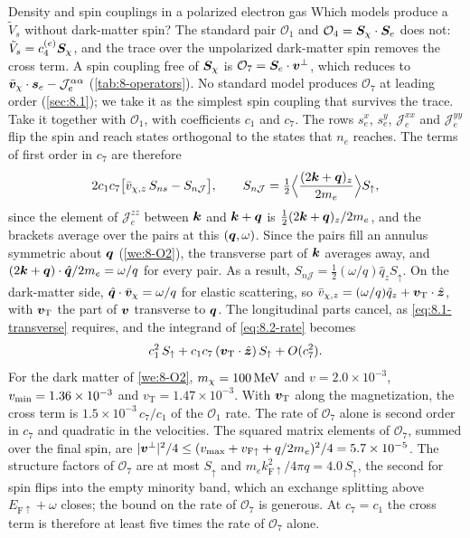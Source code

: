 \begin{workedexample}{Density and spin couplings in a polarized electron gas}
Which models produce a $\tilde V_s$ without dark-matter spin? The standard pair $\mathcal{O}_1$ and $\mathcal{O}_4 = \bm{S}_\chi\cdot\bm{S}_e$ does not: $\tilde V_s = c_4^{(e)}\bm{S}_\chi$, and the trace over the unpolarized dark-matter spin removes the cross term. A spin coupling free of $\bm{S}_\chi$ is $\mathcal{O}_7 = \bm{S}_e\cdot\bm{v}^\perp$, which reduces to $\bar{\bm{v}}_\chi\cdot\bm{s}_e - \mathcal{J}^{\alpha\alpha}_e$ (\cref{tab:8-operators}). No standard model produces $\mathcal{O}_7$ at leading order (\cref{sec:8.1}); we take it as the simplest spin coupling that survives the trace. Take it together with $\mathcal{O}_1$, with coefficients $c_1$ and $c_7$. The rows $s^x_e$, $s^y_e$, $\mathcal{J}^{xx}_e$ and $\mathcal{J}^{yy}_e$ flip the spin and reach states orthogonal to the states that $n_e$ reaches. The terms of first order in $c_7$ are therefore
\begin{equation*}
  2c_1c_7\bigl[\bar v_{\chi,z}\,S_{ns} - S_{n\mathcal{J}}\bigr], \qquad
  S_{n\mathcal{J}} = \tfrac12\Bigl\langle\frac{(2\bm{k} + \bm{q})_z}{2m_e}\Bigr\rangle S_\uparrow ,
\end{equation*}
since the element of $\mathcal{J}^{zz}_e$ between $\bm{k}$ and $\bm{k} + \bm{q}$ is $\frac12(2\bm{k} + \bm{q})_z/2m_e$, and the brackets average over the pairs at this $(\bm{q},\omega)$. Since the pairs fill an annulus symmetric about $\bm{q}$ (\cref{we:8-O2}), the transverse part of $\bm{k}$ averages away, and $(2\bm{k} + \bm{q})\cdot\hat{\bm{q}}/2m_e = \omega/q$ for every pair. As a result, $S_{n\mathcal{J}} = \frac12(\omega/q)\hat q_zS_\uparrow$. On the dark-matter side, $\hat{\bm{q}}\cdot\bar{\bm{v}}_\chi = \omega/q$ for elastic scattering, so $\bar v_{\chi,z} = (\omega/q)\hat q_z + \bm{v}_{\mathrm{T}}\cdot\hat{\bm{z}}$, with $\bm{v}_{\mathrm{T}}$ the part of $\bm{v}$ transverse to $\bm{q}$. The longitudinal parts cancel, as \cref{eq:8.1-transverse} requires, and the integrand of \cref{eq:8.2-rate} becomes
\begin{equation*}
  c_1^2\,S_\uparrow + c_1c_7\,(\bm{v}_{\mathrm{T}}\cdot\hat{\bm{z}})\,S_\uparrow + O(c_7^2) .
\end{equation*}
For the dark matter of \cref{we:8-O2}, $m_{\chi} = \SI{100}{MeV}$ and $v = 2.0\times10^{-3}$, $v_{\mathrm{min}} = 1.36\times10^{-3}$ and $v_{\mathrm{T}} = 1.47\times10^{-3}$. With $\bm{v}_{\mathrm{T}}$ along the magnetization, the cross term is $1.5\times10^{-3}\,c_7/c_1$ of the $\mathcal{O}_1$ rate. The rate of $\mathcal{O}_7$ alone is second order in $c_7$ and quadratic in the velocities. The squared matrix elements of $\mathcal{O}_7$, summed over the final spin, are $|\bm{v}^\perp|^2/4 \le (v_{\mathrm{max}} + v_{\mathrm{F}\uparrow} + q/2m_e)^2/4 = 5.7\times10^{-5}$. The structure factors of $\mathcal{O}_7$ are at most $S_\uparrow$ and $m_ek_{\mathrm{F}\uparrow}^2/4\pi q = 4.0\,S_\uparrow$, the second for spin flips into the empty minority band, which an exchange splitting above $E_{\mathrm{F}\uparrow} + \omega$ closes; the bound on the rate of $\mathcal{O}_7$ is generous. At $c_7 = c_1$ the cross term is therefore at least five times the rate of $\mathcal{O}_7$ alone.


\end{workedexample}
